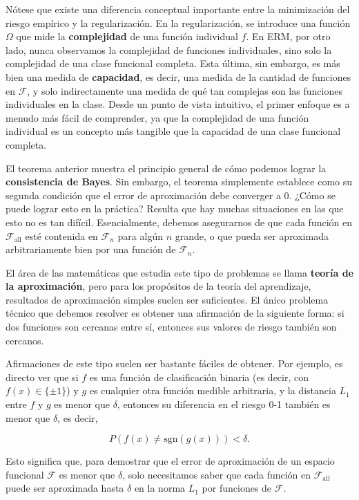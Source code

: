 \documentclass{report}
\begin{document}
Nótese que existe una diferencia conceptual importante entre la minimización del riesgo empírico y la 
regularización. En la regularización, se introduce una función \(\Omega\) que mide la \textbf{complejidad} de 
una función individual \(f\). En ERM, por otro lado, nunca observamos la complejidad de funciones individuales, 
sino solo la complejidad de una clase funcional completa. Esta última, sin embargo, es más bien una medida de 
\textbf{capacidad}, es decir, una medida de la cantidad de funciones en \(\mathcal{F}\), y solo indirectamente 
una medida de qué tan complejas son las funciones individuales en la clase. Desde un punto de vista intuitivo, 
el primer enfoque es a menudo más fácil de comprender, ya que la complejidad de una función individual es un 
concepto más tangible que la capacidad de una clase funcional completa.\newline

El teorema anterior muestra el principio general de cómo podemos lograr la \textbf{consistencia de Bayes}. 
Sin embargo, el teorema simplemente establece como su segunda condición que el error de aproximación 
debe converger a \(0\). ¿Cómo se puede lograr esto en la práctica? Resulta que hay muchas situaciones 
en las que esto no es tan difícil. Esencialmente, debemos asegurarnos de que cada función en 
\(\mathcal{F}_{\text{all}}\) esté contenida en \(\mathcal{F}_n\) para algún \(n\) grande, o que pueda 
ser aproximada arbitrariamente bien por una función de \(\mathcal{F}_n\).\newline

El área de las matemáticas que estudia este tipo de problemas se llama \textbf{teoría de la aproximación}, 
pero para los propósitos de la teoría del aprendizaje, resultados de aproximación simples suelen ser 
suficientes. El único 
problema técnico que debemos resolver es obtener una afirmación de la siguiente forma: si dos funciones 
son cercanas entre sí, entonces sus valores de riesgo también son cercanos.

Afirmaciones de este tipo suelen ser bastante fáciles de obtener. Por ejemplo, es directo ver que si 
\(f\) es una función de clasificación binaria (es decir, con \(f(x) \in \{\pm1\}\)) y \(g\) es cualquier 
otra función medible arbitraria, y la distancia \(L_1\) entre \(f\) y \(g\) es menor que \(\delta\), 
entonces su diferencia en el riesgo 0-1 también es menor que \(\delta\), es decir,

\[
P(f(x) \neq \text{sgn}(g(x))) < \delta.
\]

Esto significa que, para demostrar que el error de aproximación de un espacio funcional \(\mathcal{F}\) 
es menor que \(\delta\), solo necesitamos saber que cada función en \(\mathcal{F}_{\text{all}}\) puede 
ser aproximada hasta \(\delta\) en la norma \(L_1\) por funciones de \(\mathcal{F}\).\newline
\end{document}
